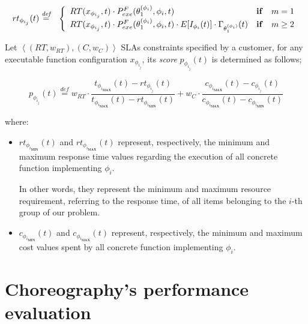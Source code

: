\documentclass[12pt,a4paper]{report}
\newcommand{\mathDef}{\overset{\textit{def}}{=}}
\begin{document}
\begin{eqnarray}
	rt_{\phi_{i_{j}}}(t) & \mathDef & \left\{ 
	\begin{array}{lcl}
	RT(x_{\phi_{i_{j}}},t) \cdot P_{exe}^{F}(\theta^{(\phi_i)}_1, \phi_i,t) & \text{\textbf{if}} & m = 1 \nonumber \\ 
	RT(x_{\phi_{i_{j}}},t) \cdot P_{exe}^{F}(\theta^{(\phi_i)}_1, \phi_i,t) \cdot E[I_{\phi_i}(t)] \cdot \Gamma_{\theta_1^{(\phi_{i})}}(t) & \text{\textbf{if}} & m \geq 2 \\ 
\end{array} \right.\label{responseTime}\\
\end{eqnarray}

Let $\left\langle (RT,w_{RT}),(C,w_{C}) \right\rangle$ SLAs constraints specified by a customer, for any executable function configuration $x_{\phi_{i_j}}$, its \textit{score} $p_{\phi_{i_{j}}}(t)$ is determined as follows;

\begin{equation}\label{profit}
	p_{\phi_{i_{j}}}(t) \mathDef w_{RT} \cdot \dfrac{t_{\phi_{i_{\textbf{MAX}}}}(t) - rt_{\phi_{i_{j}}}(t)}{t_{\phi_{i_{\textbf{MAX}}}}(t) - rt_{\phi_{i_{\textbf{MIN}}}}(t)} + w_{C} \cdot \dfrac{c_{\phi_{i_{\textbf{MAX}}}}(t) - c_{\phi_{i_{j}}}(t)}{c_{\phi_{i_{\textbf{MAX}}}}(t) - c_{\phi_{i_{\textbf{MIN}}}}(t)}
\end{equation}

where:

\begin{itemize}
	\item $rt_{\phi_{i_{\textbf{MIN}}}}(t)$ and $rt_{\phi_{i_{\textbf{MAX}}}}(t)$ represent, respectively, the minimum and maximum response time values regarding the execution of all concrete function implementing $\phi_i$. 
	
	In other words, they represent the minimum and maximum resource requirement, referring to the response time, of all items belonging to the $i$-th group of our problem.
	
	\item $c_{\phi_{i_{\textbf{MIN}}}}(t)$ and $c_{\phi_{i_{\textbf{MAX}}}}(t)$ represent, respectively, the minimum and maximum cost values spent by all concrete function implementing $\phi_i$.
\end{itemize}




\section{Choreography's performance evaluation}
\end{document}
